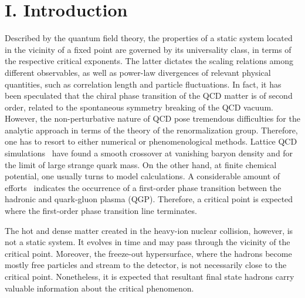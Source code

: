 \documentclass[secnumarabic, graphics,floatfix, nofootinbib,tightenlines,nobibnotes, aps, prl, 12pt]{revtex4-1}
\begin{document}
\maketitle


\section{I. Introduction}

Described by the quantum field theory, the properties of a static system located in the vicinity of a fixed point are governed by its universality class, in terms of the respective critical exponents.
The latter dictates the scaling relations among different observables, as well as power-law divergences of relevant physical quantities, such as correlation length and particle fluctuations.
In fact, it has been speculated that the chiral phase transition of the QCD matter is of second order, related to the spontaneous symmetry breaking of the QCD vacuum.
However, the non-perturbative nature of QCD pose tremendous difficulties for the analytic approach in terms of the theory of the renormalization group.
Therefore, one has to resort to either numerical or phenomenological methods.
Lattice QCD simulations~\cite{lattice-01,lattice-02} have found a smooth crossover at vanishing baryon density and for the limit of large strange quark mass.
On the other hand, at finite chemical potential, one usually turns to model calculations.
A considerable amount of efforts~\cite{Halasz:1998qr, Berges:1998rc, Stephanov:1998dy, Schwarz:1999dj, Fodor:2004nz} indicates the occurrence of a first-order phase transition between the hadronic and quark-gluon plasma (QGP).
Therefore, a critical point is expected where the first-order phase transition line terminates.

The hot and dense matter created in the heavy-ion nuclear collision, however, is not a static system.
It evolves in time and may pass through the vicinity of the critical point.
Moreover, the freeze-out hypersurface, where the hadrons become mostly free particles and stream to the detector, is not necessarily close to the critical point.
Nonetheless, it is expected that resultant final state hadrons carry valuable information about the critical phenomenon.
\end{document}

